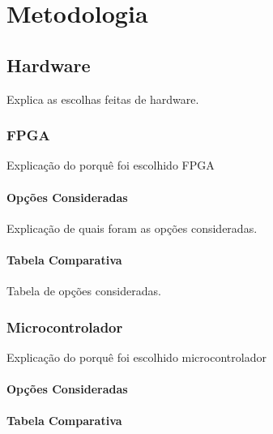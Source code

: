 	\chapter{Metodologia}\label{cap-metodologia}
	
	\section{Hardware}\label{sec-hardware}
	
	Explica as escolhas feitas de hardware.
	
	\subsection{FPGA}
	
	Explicação do porquê foi escolhido FPGA
	
	\subsubsection{Opções Consideradas}\label{fpga-opcoes}
	
	Explicação de quais foram as opções consideradas.
	
	\subsubsection{Tabela Comparativa}\label{fpga-comparativo}
	
	Tabela de opções consideradas.
	
	\subsection{Microcontrolador}
	
	Explicação do porquê foi escolhido microcontrolador
	
	\subsubsection{Opções Consideradas}\label{uc-opcoes}
	
	\lipsum[14]
	
	\subsubsection{Tabela Comparativa}\label{uc-comparativo}
	
